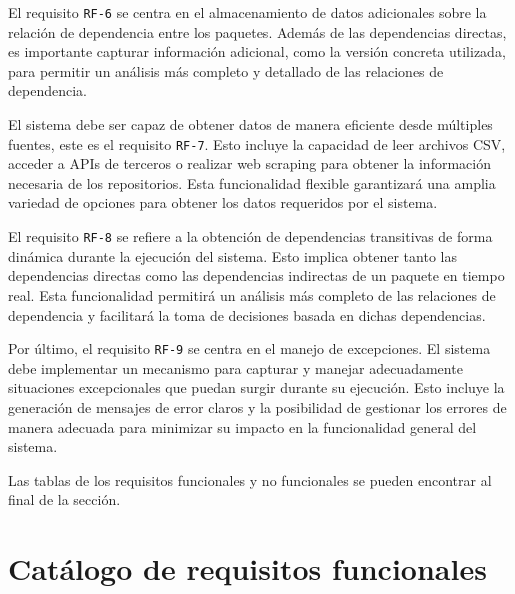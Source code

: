 El requisito \texttt{RF-6} se centra en el almacenamiento de datos adicionales sobre la
relación de dependencia entre los paquetes. Además de las dependencias directas, es
importante capturar información adicional, como la versión concreta utilizada, para
permitir un análisis más completo y detallado de las relaciones de dependencia.

El sistema debe ser capaz de obtener datos de manera eficiente desde múltiples fuentes, este
es el requisito \texttt{RF-7}. Esto incluye la capacidad de leer archivos CSV, acceder a
APIs de terceros o realizar web scraping para obtener la información necesaria de los
repositorios. Esta funcionalidad flexible garantizará una amplia variedad de opciones para
obtener los datos requeridos por el sistema.

El requisito \texttt{RF-8} se refiere a la obtención de dependencias transitivas de forma dinámica durante la ejecución
del sistema. Esto implica obtener tanto las dependencias directas como las dependencias
indirectas de un paquete en tiempo real. Esta funcionalidad permitirá un análisis más completo
de las relaciones de dependencia y facilitará la toma de decisiones basada en dichas dependencias.

Por último, el requisito \texttt{RF-9} se centra en el manejo de excepciones. El sistema
debe implementar un mecanismo para capturar y manejar adecuadamente situaciones excepcionales
que puedan surgir durante su ejecución. Esto incluye la generación de mensajes de error
claros y la posibilidad de gestionar los errores de manera adecuada para minimizar su
impacto en la funcionalidad general del sistema.

Las tablas de los requisitos funcionales y no funcionales se pueden encontrar al final de la sección.

\section{Catálogo de requisitos funcionales}

